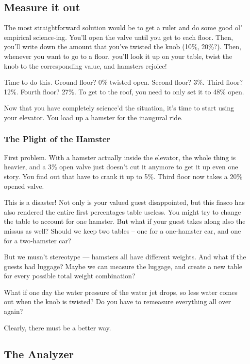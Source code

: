 \documentclass[]{article}
\begin{document}
\subsection{Measure it out}\label{measure-it-out}

The most straightforward solution would be to get a ruler and do some
good ol' empirical science-ing. You'll open the valve until you get to
each floor. Then, you'll write down the amount that you've twisted the
knob (10\%, 20\%?). Then, whenever you want to go to a floor, you'll
look it up on your table, twist the knob to the corresponding value, and
hamsters rejoice!

Time to do this. Ground floor? 0\% twisted open. Second floor? 3\%.
Third floor? 12\%. Fourth floor? 27\%. To get to the roof, you need to
only set it to 48\% open.

Now that you have completely science'd the situation, it's time to start
using your elevator. You load up a hamster for the inaugural ride.

\subsubsection{The Plight of the
Hamster}\label{the-plight-of-the-hamster}

First problem. With a hamster actually inside the elevator, the whole
thing is heavier, and a 3\% open valve just doesn't cut it anymore to
get it up even one story. You find out that have to crank it up to 5\%.
Third floor now takes a 20\% opened valve.

This is a disaster! Not only is your valued guest disappointed, but this
fiasco has also rendered the entire first percentages table useless. You
might try to change the table to account for one hamster. But what if
your guest takes along also the missus as well? Should we keep two
tables -- one for a one-hamster car, and one for a two-hamster car?

But we musn't stereotype --- hamsters all have different weights. And
what if the guests had luggage? Maybe we can measure the luggage, and
create a new table for every possible total weight combination?

What if one day the water pressure of the water jet drops, so less water
comes out when the knob is twisted? Do you have to remeasure everything
all over again?

Clearly, there must be a better way.

\subsection{The Analyzer}\label{the-analyzer}
\end{document}
